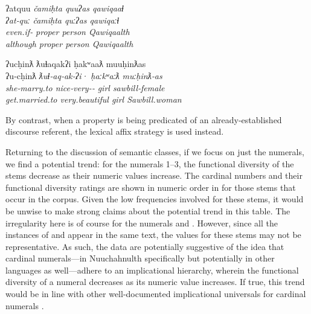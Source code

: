 \begin{exe}
  \ex\label{ex:4.6}
  \begin{xlist}

    \ex\label{ex:4.6a}
    \gllll ʔatquu              \em{čamiḥta} quuʔas qawiqaaɬ\\
           ʔat‑quː             \em{čamiḥta} quːʔas qawiqaːɬ\\
           even.if‑ \em{proper}  person Qawiqaalth\\
           although            \em{proper}  person Qawiqaalth\\

    \ex\label{ex:4.6b}
    \gllll ʔucḥinƛ        ƛuɬaqakʔi                      ḥakʷaaƛ  muuḥinƛas\\
           ʔu‑cḥinƛ       \em{ƛuɬ}‑aq‑ak‑ʔi·               ḥaːkʷaːƛ muːḥinƛ‑as\\
           she‑marry.to   \em{nice}‑very‑‑ girl     sawbill‑female\\
           get.married.to very.beautiful                 girl     Sawbill.woman\\

  \end{xlist}
\end{exe}

\noindent By contrast, when a property is being predicated of an already-established discourse referent, the lexical affix strategy is used instead.

Returning to the discussion of semantic classes, if we focus on just the numerals, we find a potential trend: for the numerals 1–3, the functional diversity of the stems decrease as their numeric values increase. The cardinal numbers and their functional diversity ratings are shown in numeric order in  for those stems that occur in the corpus. Given the low frequencies involved for these stems, it would be unwise to make strong claims about the potential trend in this table. The irregularity here is of course for the numerals  and . However, since all the instances of  and  appear in the same text, the values for these stems may not be representative. As such, the data are potentially suggestive of the idea that cardinal numerals—in Nuuchahnulth specifically but potentially in other languages as well—adhere to an implicational hierarchy, wherein the functional diversity of a numeral decreases as its numeric value increases. If true, this trend would be in line with other well-documented implicational universals for cardinal numerals \parencites{DehaeneMehler1992}[141]{Croft2003}.

